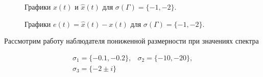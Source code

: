 \begin{figure}[!h]
\caption{Графики $x(t)$ и $\hat{x}(t)$ для $ \sigma (\Gamma) = \{ -1, -2 \}$.}
\label{3_xx_nlin_02_LW1}
\end{figure}


\begin{figure}[!h]
\caption{Графики $e (t) =\hat{x}(t) - x(t)$ для $ \sigma (\Gamma) = \{ -1, -2 \}$.}
\label{3_e_nlin_02_LW1}
\end{figure}

Рассмотрим работу наблюдателя пониженной размерности при значениях спектра 

\begin{equation*}
  \begin{matrix}
      \sigma_1 = \{ -0.1, -0.2 \}, & \sigma_2 = \{ -10, -20 \},\\
      \sigma_3 = \{ -2  \pm i \} & 
 \end{matrix}
\end{equation*}

